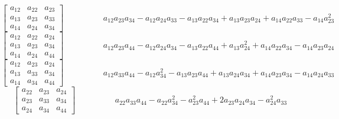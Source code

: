 $$\left[\begin{matrix}a_{12} & a_{22} & a_{23}\\a_{13} & a_{23} & a_{33}\\a_{14} & a_{24} & a_{34}\end{matrix}\right]\hspace{2cm} a_{12} a_{23} a_{34} - a_{12} a_{24} a_{33} - a_{13} a_{22} a_{34} + a_{13} a_{23} a_{24} + a_{14} a_{22} a_{33} - a_{14} a_{23}^{2}$$   
$$\left[\begin{matrix}a_{12} & a_{22} & a_{24}\\a_{13} & a_{23} & a_{34}\\a_{14} & a_{24} & a_{44}\end{matrix}\right]\hspace{2cm} a_{12} a_{23} a_{44} - a_{12} a_{24} a_{34} - a_{13} a_{22} a_{44} + a_{13} a_{24}^{2} + a_{14} a_{22} a_{34} - a_{14} a_{23} a_{24}$$   
$$\left[\begin{matrix}a_{12} & a_{23} & a_{24}\\a_{13} & a_{33} & a_{34}\\a_{14} & a_{34} & a_{44}\end{matrix}\right]\hspace{2cm} a_{12} a_{33} a_{44} - a_{12} a_{34}^{2} - a_{13} a_{23} a_{44} + a_{13} a_{24} a_{34} + a_{14} a_{23} a_{34} - a_{14} a_{24} a_{33}$$   
$$\left[\begin{matrix}a_{22} & a_{23} & a_{24}\\a_{23} & a_{33} & a_{34}\\a_{24} & a_{34} & a_{44}\end{matrix}\right]\hspace{2cm} a_{22} a_{33} a_{44} - a_{22} a_{34}^{2} - a_{23}^{2} a_{44} + 2 a_{23} a_{24} a_{34} - a_{24}^{2} a_{33}$$